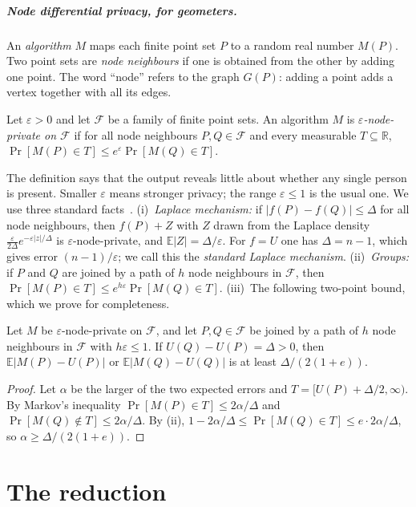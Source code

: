 \documentclass[anonymous,a4paper,USenglish,cleveref,autoref,thm-restate]{socg-lipics-v2021}
\newcommand{\R}{\mathbb{R}}
\newcommand{\eps}{\varepsilon}
\newcommand{\cF}{\mathcal{F}}
\newcommand{\Ex}{\mathbb{E}}
\begin{document}
\subparagraph*{Node differential privacy, for geometers.}
An \emph{algorithm} $M$ maps each finite point set $P$ to a random real number $M(P)$. Two point sets are \emph{node neighbours} if one is obtained from the other by adding one point. The word ``node'' refers to the graph $G(P)$: adding a point adds a vertex together with all its edges.

\begin{definition}
Let $\eps>0$ and let $\cF$ be a family of finite point sets. An algorithm $M$ is \emph{$\eps$-node-private on $\cF$} if for all node neighbours $P,Q\in\cF$ and every measurable $T\subseteq\R$,
\(
  \Pr[M(P)\in T]\le e^{\eps}\Pr[M(Q)\in T].
\)
\end{definition}

The definition says that the output reveals little about whether any single person is present. Smaller $\eps$ means stronger privacy; the range $\eps\le1$ is the usual one. We use three standard facts~\cite{DMNS06,DworkRoth14}. (i)~\emph{Laplace mechanism:} if $|f(P)-f(Q)|\le\Delta$ for all node neighbours, then $f(P)+Z$ with $Z$ drawn from the Laplace density $\frac{\eps}{2\Delta}e^{-\eps|z|/\Delta}$ is $\eps$-node-private, and $\Ex|Z|=\Delta/\eps$. For $f=U$ one has $\Delta=n-1$, which gives error $(n-1)/\eps$; we call this the \emph{standard Laplace mechanism}. (ii)~\emph{Groups:} if $P$ and $Q$ are joined by a path of $h$ node neighbours in $\cF$, then $\Pr[M(P)\in T]\le e^{h\eps}\Pr[M(Q)\in T]$. (iii)~The following two-point bound, which we prove for completeness.

\begin{lemma}
\label{lem:two-point}
Let $M$ be $\eps$-node-private on $\cF$, and let $P,Q\in\cF$ be joined by a path of $h$ node neighbours in $\cF$ with $h\eps\le1$. If $U(Q)-U(P)=\Delta>0$, then $\Ex|M(P)-U(P)|$ or $\Ex|M(Q)-U(Q)|$ is at least $\Delta/(2(1+e))$.
\end{lemma}

\begin{proof}
Let $\alpha$ be the larger of the two expected errors and $T=[U(P)+\Delta/2,\infty)$. By Markov's inequality $\Pr[M(P)\in T]\le 2\alpha/\Delta$ and $\Pr[M(Q)\notin T]\le2\alpha/\Delta$. By (ii), $1-2\alpha/\Delta\le\Pr[M(Q)\in T]\le e\cdot 2\alpha/\Delta$, so $\alpha\ge\Delta/(2(1+e))$.
\end{proof}

\section{The reduction}
\label{sec:reduction}
\end{document}
